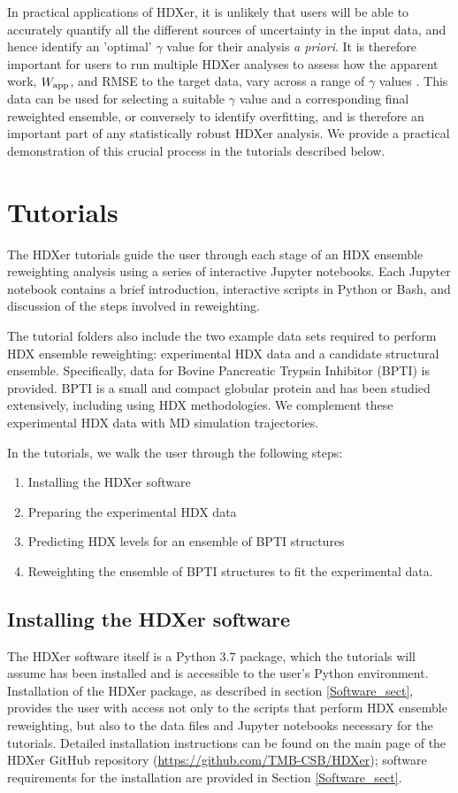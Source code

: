 \documentclass[9pt,tutorial]{livecoms}
\begin{document}
In practical applications of HDXer, it is unlikely that users will be able to accurately quantify all the different sources of uncertainty in the input data, and hence identify an 'optimal' $\gamma$ value for their analysis \textit{a priori}.
It is therefore important for users to run multiple HDXer analyses to assess how the apparent work, $W_\textnormal{app}$, and RMSE to the target data, vary across a range of $\gamma$ values \cite{Orioli2020}.
This data can be used for selecting a suitable $\gamma$ value and a corresponding final reweighted ensemble, or conversely to identify overfitting, and is therefore an important part of any statistically robust HDXer analysis.
We provide a practical demonstration of this crucial process in the tutorials described below.

\section{Tutorials}\label{tutorial_sect}

The HDXer tutorials guide the user through each stage of an HDX ensemble reweighting analysis using a series of interactive Jupyter notebooks.
Each Jupyter notebook contains a brief introduction, interactive scripts in Python or Bash, and discussion of the steps involved in reweighting.

The tutorial folders also include the two example data sets required to perform HDX ensemble reweighting: experimental HDX data and a candidate structural ensemble.
Specifically, data for Bovine Pancreatic Trypsin Inhibitor (BPTI) is provided.
BPTI is a small and compact globular protein and has been studied extensively, including using HDX methodologies. 
We complement these experimental HDX data with MD simulation trajectories.

In the tutorials, we walk the user through the following steps:
\begin{enumerate}
  \item Installing the HDXer software
  \item Preparing the experimental HDX data
  \item Predicting HDX levels for an ensemble of BPTI structures
  \item Reweighting the ensemble of BPTI structures to fit the experimental data.
\end{enumerate}

\subsection{Installing the HDXer software}
The HDXer software itself is a Python 3.7 package, which the tutorials will assume has been installed and is accessible to the user's Python environment.
Installation of the HDXer package, as described in section \ref{Software_sect}, provides the user with access not only to the scripts that perform HDX ensemble reweighting, but also to the data files and Jupyter notebooks necessary for the tutorials.
Detailed installation instructions can be found on the main page of the HDXer GitHub repository (\url{https://github.com/TMB-CSB/HDXer}); software requirements for the installation are provided in Section \ref{Software_sect}. 
\end{document}
